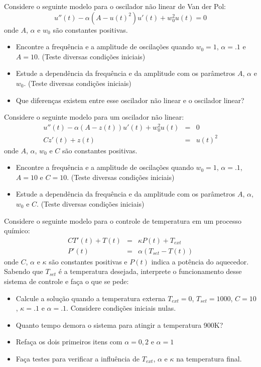 \begin{exer} Considere o seguinte modelo para o oscilador não linear de Van der Pol:
\begin{equation} u''(t) - \alpha (A-u(t)^2)u'(t) + w_0^2u(t)=0 \end{equation}
onde $A$, $\alpha$ e $w_0$ são constantes positivas.
\begin{itemize}
\item[a)] Encontre a frequência e a amplitude de oscilações quando $w_0=1$, $\alpha=.1$ e $A=10$. (Teste diversas condições iniciais)
\item[b)] Estude a dependência da frequência e da amplitude com os parâmetros  $A$, $\alpha$ e $w_0$. (Teste diversas condições iniciais)
\item[c)] Que diferenças existem entre esse oscilador não linear e o oscilador linear?
\end{itemize}
\end{exer}

\begin{exer} Considere o seguinte modelo para um oscilador não linear:
\begin{eqnarray}
u''(t)-\alpha(A-z(t))u'(t)+w_0^2 u(t)&=&0\\
Cz'(t)+z(t)&=&u(t)^2
\end{eqnarray}
onde $A$, $\alpha$, $w_0$ e $C$ são constantes positivas.
\begin{itemize}
\item[a)] Encontre a frequência e a amplitude de oscilações quando $w_0=1$, $\alpha=.1$, $A=10$ e $C=10$. (Teste diversas condições iniciais)
\item[b)] Estude a dependência da frequência e da amplitude com os parâmetros  $A$, $\alpha$, $w_0$ e $C$. (Teste diversas condições iniciais)
\end{itemize}
\end{exer}

\begin{exer} Considere o seguinte modelo para o controle de temperatura em um processo químico:
\begin{eqnarray}
CT'(t)+T(t)&=&\kappa P(t)+T_{ext}\\
P'(t)&=&\alpha(T_{set}-T(t))
\end{eqnarray}
onde $C$, $\alpha$ e $\kappa$ são constantes positivas e $P(t)$ indica a potência do aquecedor. Sabendo que $T_{set}$ é a temperatura desejada, interprete o funcionamento desse sistema de controle e faça o que se pede:
\begin{itemize}
\item[a)] Calcule a solução quando a temperatura externa $T_{ext}=0$, $T_{set}=1000$, $C=10$, $\kappa=.1$ e $\alpha=.1$. Considere condições iniciais nulas.
\item[b)] Quanto tempo demora o sistema para atingir a temperatura 900K?
\item[c)] Refaça os dois primeiros itens com $\alpha=0,2$ e $\alpha=1$
\item[d)] Faça testes para verificar a influência de $T_{ext}$, $\alpha$ e $\kappa$ na temperatura final.
\end{itemize}
\end{exer}

